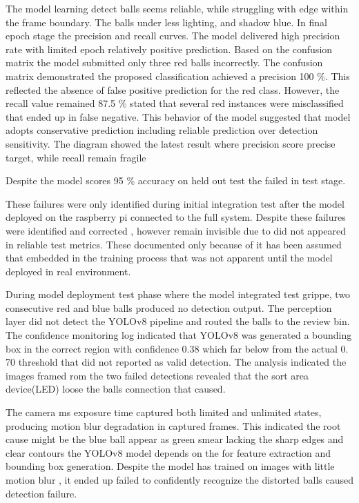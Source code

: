 The model learning detect balls seems reliable, while struggling with edge within the frame boundary. The balls under less lighting, and shadow blue. In final epoch stage the precision and recall curves. The model delivered high precision rate with limited epoch relatively positive prediction. Based on the confusion matrix the model submitted only three red balls incorrectly. The confusion matrix demonstrated the proposed classification achieved a precision 100 \%. This reflected the absence of false positive prediction for the red class. However, the recall value remained 87.5 \% stated that several red instances were misclassified that ended up in false negative. This behavior of the model suggested that model adopts conservative prediction including reliable prediction over detection sensitivity. The diagram showed the latest result where precision score precise target, while recall remain fragile 



 Despite the model scores 95 \% accuracy on held out test the failed in test stage. 

  These failures were only identified during initial integration test after the model deployed on the raspberry pi connected to the full system. Despite these failures were identified and corrected , however remain invisible due to did not appeared in reliable test metrics. These documented only because of it has been assumed that embedded in the training process that was not apparent until the model deployed in real environment.

 During model deployment test phase where the model integrated test grippe, two consecutive red and blue balls produced no detection output. The perception layer did not detect the YOLOv8 pipeline and routed the balls to the review bin. The confidence monitoring log indicated that YOLOv8 was generated a bounding box in the correct region with confidence 0.38 which far below from the actual 0. 70 threshold that did not reported as valid detection. The analysis indicated the images framed rom the two failed detections revealed that the sort area device(LED) loose the balls connection that caused.

The camera ms exposure time captured both limited and unlimited states, producing motion blur degradation in captured frames. This indicated the root cause might be the blue ball appear as green smear lacking the sharp edges and clear contours the YOLOv8 model depends on the for feature extraction and bounding box generation. Despite the model has trained on images with little motion blur , it ended up failed to confidently recognize the distorted balls caused detection failure.

